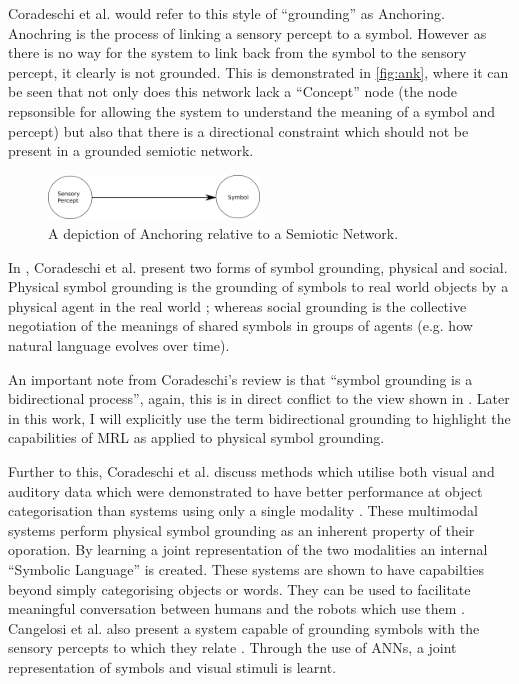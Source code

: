 Coradeschi et al. \cite{coradeschi2000anchoring, coradeschi2003introduction} would refer to this style of ``grounding'' as Anchoring. Anochring is the process of linking a sensory percept to a symbol. However as there is no way for the system to link back from the symbol to the sensory percept, it clearly is not grounded. This is demonstrated in \autoref{fig:ank}, where it can be seen that not only does this network lack a ``Concept'' node (the node repsonsible for allowing the system to understand the meaning of a symbol and percept) but also that there is a directional constraint which should not be present in a grounded semiotic network. 

\begin{figure}
\centering
\includegraphics[width=0.5\textwidth]{Figs/litReview/anchoring.png}
\caption{A depiction of Anchoring relative to a Semiotic Network.}
\label{fig:ank}

\end{figure}


In \cite{coradeschi2013short}, Coradeschi et al. present two forms of symbol grounding, physical and social. Physical symbol grounding is the grounding of symbols to real world objects by a physical agent in the real world \cite{vogt2002physical}; whereas social grounding is the collective negotiation of the meanings of shared symbols in groups of agents \cite{cangelosi2006grounding} (e.g. how natural language evolves over time).

An important note from Coradeschi's review \cite{coradeschi2013short} is that ``symbol grounding is a bidirectional process'', again, this is in direct conflict to the view shown in \cite{lemonlearning, yu2017learning}. Later in this work, I will explicitly use the term bidirectional grounding to highlight the capabilities of \ac{MRL} as applied to physical symbol grounding.

Further to this, Coradeschi et al. discuss methods which utilise both visual and auditory data which were demonstrated to have better performance at object categorisation than systems using only a single modality \cite{coradeschi2013short}. These multimodal systems perform physical symbol grounding as an inherent property of their oporation. By learning a joint representation of the two modalities an internal ``Symbolic Language'' is created. These systems are shown to have capabilties beyond simply categorising objects or words. They can be used to facilitate meaningful conversation between humans and the robots which use them \cite{nakamura2009grounding, nakamura2011grounding}. Cangelosi et al. also present a system capable of grounding symbols with the sensory percepts to which they relate \cite{cangelosi2000robotic}. Through the use of \acp{ANN}, a joint representation of symbols and visual stimuli is learnt.

